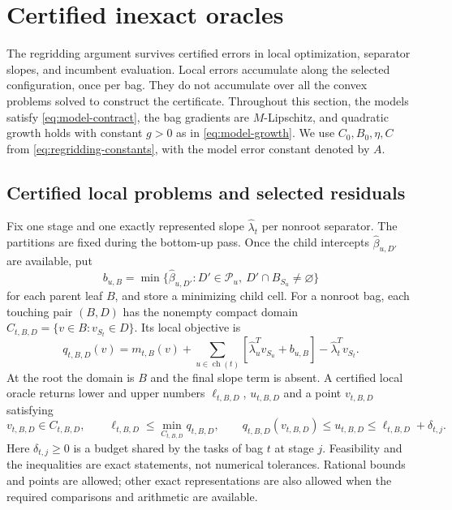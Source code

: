 \section{Certified inexact oracles}
\label{sec:inexact}

The regridding argument survives certified errors in local optimization,
separator slopes, and incumbent evaluation.  Local errors accumulate along
the selected configuration, once per bag.  They do not accumulate over all
the convex problems solved to construct the certificate.  Throughout this
section, the models satisfy \eqref{eq:model-contract}, the bag gradients
are $M$-Lipschitz, and quadratic growth holds with constant $g>0$ as in
\eqref{eq:model-growth}.  We use $C_0,B_0,\eta,C$ from
\eqref{eq:regridding-constants}, with the model error constant denoted by
$A$.

\subsection{Certified local problems and selected residuals}

Fix one stage and one exactly represented slope $\widehat\lambda_t$ per
nonroot separator.  The partitions are fixed during the bottom-up pass.
Once the child intercepts $\widehat\beta_{u,D'}$ are available, put
\[
 b_{u,B}=\min\{\widehat\beta_{u,D'}:
                 D'\in\mathcal P_u,\ D'\cap B_{S_u}\ne\varnothing\}
\]
for each parent leaf $B$, and store a minimizing child cell.  For a
nonroot bag, each touching pair $(B,D)$ has the nonempty compact domain
$C_{t,B,D}=\{v\in B:v_{S_t}\in D\}$.  Its local objective is
\begin{equation}
 q_{t,B,D}(v)=m_{t,B}(v)
       +\sum_{u\in\operatorname{ch}(t)}
                  [\widehat\lambda_u^T v_{S_u}+b_{u,B}]
       -\widehat\lambda_t^T v_{S_t}.
 \label{eq:inexact-local-objective}
\end{equation}
At the root the domain is $B$ and the final slope term is absent.  A
certified local oracle returns lower and upper numbers $\ell_{t,B,D}$,
$u_{t,B,D}$ and a point $v_{t,B,D}$ satisfying
\begin{equation}
 v_{t,B,D}\in C_{t,B,D},\qquad
 \ell_{t,B,D}\le\min_{C_{t,B,D}}q_{t,B,D},\qquad
 q_{t,B,D}(v_{t,B,D})\le u_{t,B,D}
                 \le\ell_{t,B,D}+\delta_{t,j}.
 \label{eq:inexact-oracle}
\end{equation}
Here $\delta_{t,j}\ge0$ is a budget shared by the tasks of bag $t$ at
stage $j$.  Feasibility and the inequalities are exact statements, not
numerical tolerances.  Rational bounds and points are allowed; other
exact representations are also allowed when the required comparisons
and arithmetic are available.

